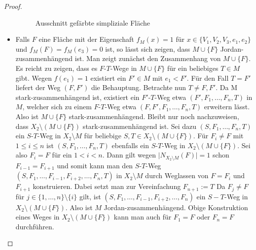 \documentclass[12pt,titlepage,twoside,cleardoublepage]{article}
\theoremstyle{nummermitklammern}
\numberwithin{equation}{section}
\begin{document}
\begin{proof}
\begin{itemize}
\begin{figure}[H]
\caption{Ausschnitt gefärbte simpliziale Fläche}
\end{figure}
\item Falls $F$ eine Fläche mit der Eigenschaft $f_M(x)=1$ für $x \in \{V_1,V_2,V_3,e_1,e_2\}$ und $f_M(F)=f_M(e_3)=0$ ist, so  lässt sich zeigen, dass $M \cup \{F\}$ Jordan-zusammenhängend ist. Man zeigt zunächst den Zusammenhang von $M\cup \{F\}$. Es reicht zu zeigen, dass es $F$-$T$-Wege in $M\cup \{F\}$ für ein beliebiges $T \in M$ gibt.
Wegen $f(e_1)=1$ existiert ein $F'\in M$ mit $e_1<F'$. Für den Fall $T=F'$ liefert der Weg $(F,F')$ die Behauptung. Betrachte nun $T \neq F,F'$. Da M stark-zusammenhängend ist, existiert ein $F'$-$T$-Weg etwa $(F',F_1,\ldots,F_n,T)$ in $M$, welcher sich zu einem $F$-$T$-Weg etwa $(F,F',F_1,\ldots,F_n,T)$ erweitern lässt. Also ist $M \cup \{F\}$ stark-zusammenhängend. Bleibt nur noch nachzuweisen, dass $X_2\setminus (M\cup \{F\})$ stark-zusammenhängend ist. Sei dazu $(S,F_1,\ldots,F_n,T)$ ein $S$-$T$-Weg in $X_2 \setminus M $ für  beliebige $S,T \in X_2\setminus ( M\cup \{F\})$. Für $F_i \neq F$ mit $1 \leq i \leq n$ ist $(S,F_1,\ldots,F_n,T)$ ebenfalls ein $S$-$T$-Weg in $X_2 \setminus (M \cup \{F\})$. Sei also $F_i=F$ für ein $1< i< n$. Dann gilt wegen $\vert N_{X_2\setminus M}(F) \vert=1$ schon $F_{i-1}=F_{i+1}$ und somit kann man den $S$-$T$-Weg $(S,F_1,\ldots,F_{i-1},F_{i+2},\ldots,F_n,T)$ in $X_2\setminus M$ durch Weglassen von $F=F_i$ und $F_{i+1}$ konstruieren. Dabei setzt man zur Vereinfachung $F_{n+1}:=T$ Da $F_j\neq F$ für $j \in \{1,\ldots , n\}\setminus \{i\}$ gilt, ist $(S,F_1,\ldots,F_{i-1},F_{i+2},\ldots,F_n)$ ein $S-T$-Weg in $X_2 \setminus (M \cup \{F\})$. Also ist $M$ Jordan-zusammenhängend.
Obige Konstruktion eines Weges in $X_2 \setminus (M \cup \{F\})$ kann man auch für $F_1=F$ oder $F_n=F$ durchführen.

\end{itemize}
\end{proof}
\end{document}
